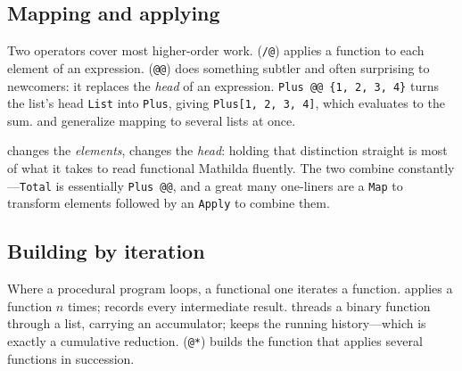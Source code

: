 
\subsection{Mapping and applying}
\label{ssec:prog-map}

Two operators cover most higher-order work.  (\texttt{/@}) applies a
function to each element of an expression.  (\texttt{@@}) does something
subtler and often surprising to newcomers: it replaces the \emph{head} of an
expression. \texttt{Plus @@ \{1, 2, 3, 4\}} turns the list's head \texttt{List}
into \texttt{Plus}, giving \texttt{Plus[1, 2, 3, 4]}, which evaluates to the sum.
 and  generalize mapping to several lists at once.

\begin{codepairs}
\end{codepairs}

 changes the \emph{elements},  changes the \emph{head}: holding
that distinction straight is most of what it takes to read functional Mathilda
fluently. The two combine constantly---\texttt{Total} is essentially
\texttt{Plus @@}, and a great many one-liners are a \texttt{Map} to transform
elements followed by an \texttt{Apply} to combine them.

\subsection{Building by iteration}
\label{ssec:prog-iterate}

Where a procedural program loops, a functional one iterates a function. 
applies a function \(n\) times;  records every intermediate result.
 threads a binary function through a list, carrying an accumulator;
 keeps the running history---which is exactly a cumulative reduction.
 (\texttt{@*}) builds the function that applies several functions
in succession.

